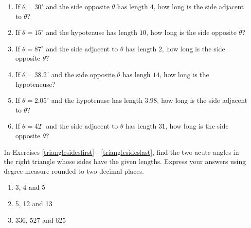 \begin{enumerate}

\setcounter{enumi}{\value{HW}}

\item  If $\theta = 30^{\circ}$ and the side opposite $\theta$ has length $4$, how long is the side adjacent to $\theta$? \label{moretrianglecircfirst}

\item  If $\theta = 15^{\circ}$ and the hypotenuse has length $10$, how long is the side opposite $\theta$?

\item  If $\theta = 87^{\circ}$ and the side adjacent to $\theta$ has length $2$, how long is the side opposite $\theta$?

\item  If $\theta = 38.2^{\circ}$ and the side opposite $\theta$ has lengh $14$, how long is the hypoteneuse?

\item  If $\theta = 2.05^{\circ}$ and the hypotenuse has length $3.98$, how long is the side adjacent to $\theta$?

\item  If $\theta = 42^{\circ}$ and the side adjacent to $\theta$ has length $31$, how long is the side opposite $\theta$? \label{moretrianglecirclast}

\setcounter{HW}{\value{enumi}}

\end{enumerate}

In Exercises \ref{trianglesidesfirst} - \ref{trianglesideslast}, find the two acute angles in the right triangle whose sides have the given lengths.  Express your answers using degree measure rounded to two decimal places.

\begin{multicols}{3}

\begin{enumerate}

\setcounter{enumi}{\value{HW}}

\item 3, 4 and 5 \label{trianglesidesfirst}

\item 5, 12 and 13

\item 336, 527 and 625 \label{trianglesideslast}

\setcounter{HW}{\value{enumi}}

\end{enumerate}

\end{multicols}


